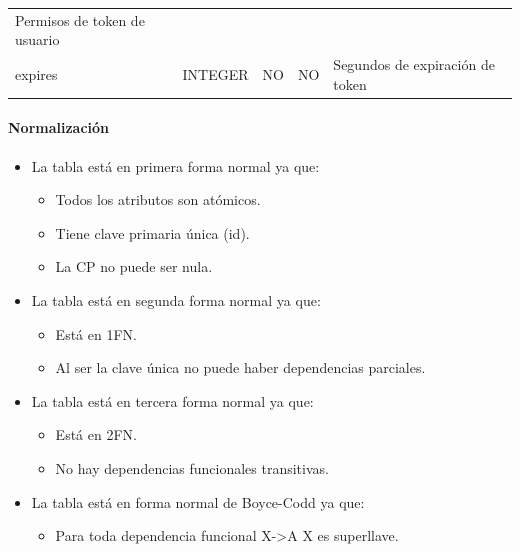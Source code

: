 \documentclass[12pt,a4paperpaper,]{report}
\providecommand{\tightlist}{%
  \setlength{\itemsep}{0pt}\setlength{\parskip}{0pt}}
\let\oldparagraph\paragraph
\renewcommand{\paragraph}[1]{\oldparagraph{#1}\mbox{}}
\begin{document}
\begin{longtable}[]{@{}lllll@{}}
\begin{minipage}[t]{0.11\columnwidth}
Permisos de token de usuario\strut
\end{minipage}\tabularnewline
\begin{minipage}[t]{0.21\columnwidth}\raggedright\strut
expires\strut
\end{minipage} & \begin{minipage}[t]{0.19\columnwidth}\raggedright\strut
INTEGER\strut
\end{minipage} & \begin{minipage}[t]{0.16\columnwidth}\raggedright\strut
NO\strut
\end{minipage} & \begin{minipage}[t]{0.19\columnwidth}\raggedright\strut
NO\strut
\end{minipage} & \begin{minipage}[t]{0.11\columnwidth}\raggedright\strut
Segundos de expiración de token\strut
\end{minipage}\tabularnewline
\bottomrule
\end{longtable}

\paragraph{Normalización}\label{normalizaciuxf3n-3}

\begin{itemize}
\tightlist
\item
  La tabla está en primera forma normal ya que:

  \begin{itemize}
  \tightlist
  \item
    Todos los atributos son atómicos.
  \item
    Tiene clave primaria única (id).
  \item
    La CP no puede ser nula.
  \end{itemize}
\item
  La tabla está en segunda forma normal ya que:

  \begin{itemize}
  \tightlist
  \item
    Está en 1FN.
  \item
    Al ser la clave única no puede haber dependencias parciales.
  \end{itemize}
\item
  La tabla está en tercera forma normal ya que:

  \begin{itemize}
  \tightlist
  \item
    Está en 2FN.
  \item
    No hay dependencias funcionales transitivas.
  \end{itemize}
\item
  La tabla está en forma normal de Boyce-Codd ya que:

  \begin{itemize}
  \tightlist
  \item
    Para toda dependencia funcional X-\textgreater{}A X es superllave.
  \end{itemize}
\end{itemize}
\end{document}
